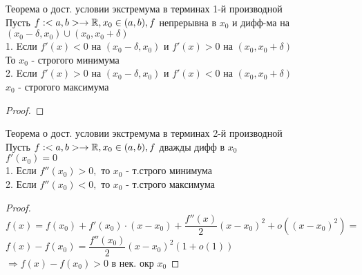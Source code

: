\begin{theorem}
	Теорема о дост. условии экстремума в терминах 1-й производной \\
	Пусть $ f : <a,b> \rightarrow \mathbb{R}, x_0 \in (a,b),\\
	f $ непрерывна в $ x_0 $ и дифф-ма на $  ( x_0 - \delta, x_0) \cup ( x_0, x_0 + \delta) $ \\
	1. Eсли $ f'(x) < 0 $ на $ (x_0 - \delta, x_0) $ и $ f'(x) > 0 $ на $ (x_0, x_0 + \delta) $ \\
	То $ x_0 $ - строгого минимума \\
	2. Eсли $ f'(x) > 0 $ на $ (x_0 - \delta, x_0) $ и $ f'(x) < 0 $ на $ (x_0, x_0 + \delta) $ \\
	$ x_0 $ - строгого максимума \\
	\begin{proof}
	\end{proof}
\end{theorem}
\begin{theorem}
	Теорема о дост. условии экстремума в терминах 2-й производной \\
	Пусть $ f : <a,b> \rightarrow \mathbb{R}, x_0 \in (a,b),\\
	f $ дважды дифф в $ x_0 $ \\
	$ f'(x_0) = 0 $ \\
	1. Если $ f''(x_0) > 0, $ то $ x_0 $ - т.строго минимума \\
	2. Если $ f''(x_0) < 0, $ то $ x_0 $ - т.строго максимума \\
	\begin{proof}
		$ f(x) = f(x_0) + f'(x_0) \cdot (x - x_0) + \dfrac{f''(x)}{2} (x - x_0)^2 + o((x-x_0)^2) = $\\
		$ f(x) - f(x_0) = \dfrac{f''(x_0)}{2} (x-x_0)^2 (1 + o(1))  $ \\
		$ \Rightarrow f(x) - f(x_0) > 0$ в нек. окр $ x_0 $ 
 	\end{proof}
\end{theorem}
